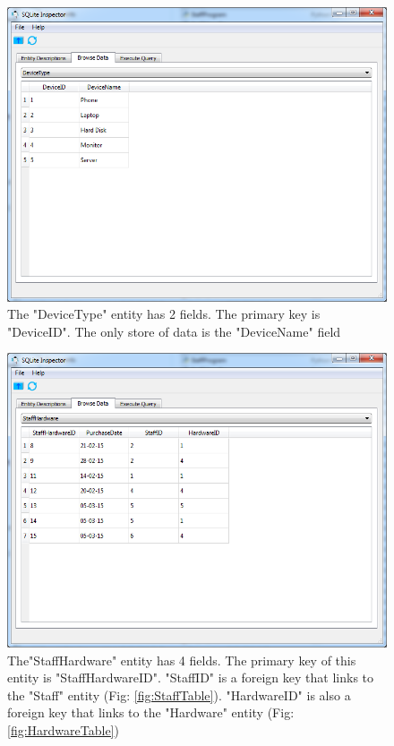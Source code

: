 \begin{figure}[H]
    \includegraphics[width=\textwidth]{./Maintenance/Images/DeviceType.png}
    \caption{The "DeviceType" entity has 2 fields. The primary key is "DeviceID". The only store of data is the "DeviceName" field} \label{fig:DeviceType}
\end{figure}

\begin{figure}[H]
    \includegraphics[width=\textwidth]{./Maintenance/Images/StaffHardware.png}
    \caption{The"StaffHardware" entity has 4 fields. The primary key of this entity is "StaffHardwareID". "StaffID" is a foreign key that links to the "Staff" entity  (Fig: \ref{fig:StaffTable}). "HardwareID" is also a foreign key that links to the "Hardware" entity (Fig: \ref{fig:HardwareTable})} \label{fig:StaffHardware}
\end{figure}

